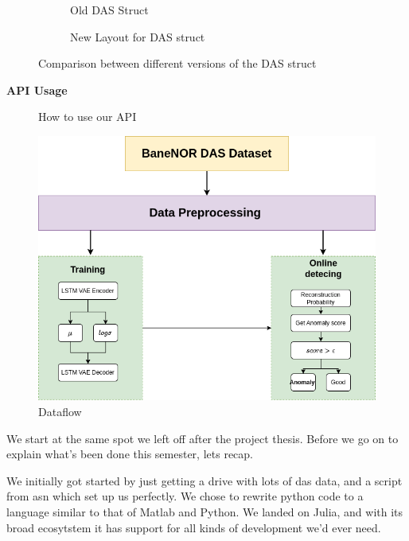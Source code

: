 \begin{figure}[h]
\centering
\begin{subfigure}{.45\textwidth}
  \centering
  
  \caption{Old DAS Struct}
  \label{fig:olddasstc}
\end{subfigure}%
\hfill
\begin{subfigure}{.45\textwidth}
  \centering
  
  \caption{New Layout for DAS struct}
  \label{fig:newdasstc}
\end{subfigure}
\caption{Comparison between different versions of the DAS struct}
\label{fig:dasstccmp}
\end{figure}



\textbf{API Usage}

\begin{figure}[h]
    \centering
    
    \caption{How to use our API}
    \label{fig:apiusage}
\end{figure}


\begin{figure}[h]
    \centering
    \includegraphics[scale=0.5]{figures/methodflow.png}
    \caption{Dataflow}
    \label{fig:dataflow}
\end{figure}
 
We start at the same spot we left off after the project thesis. Before we go on to explain what's been done this semester, lets recap. 

We initially got started by just getting a drive with lots of \acrshort{das} data, and a script from \acrfull{asn} which set up us perfectly. We chose to rewrite python code to a language similar to that of Matlab and Python. We landed on Julia, and with its broad ecosytstem it has support for all kinds of development we'd ever need. \\

